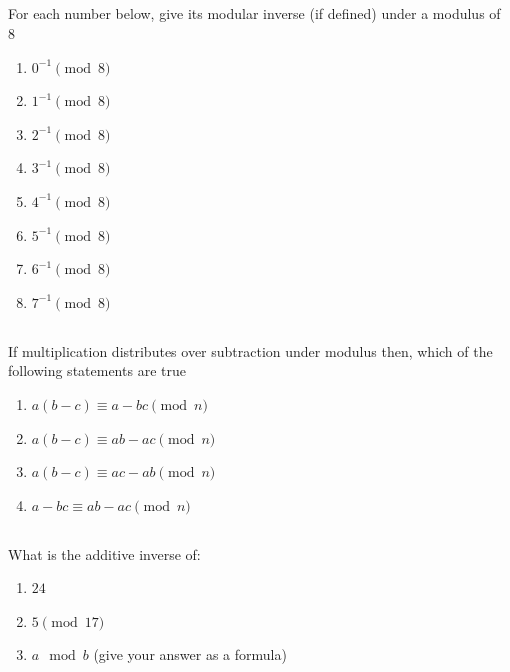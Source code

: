 \documentclass[twocolumn]{article}
\begin{document}
\subsection{}

    For each number below, give its modular inverse (if defined) under a modulus of 8

    \begin{multicols}{2}
    \begin{enumerate}
        \item $ 0^{-1} \pmod{8} $
        \item $ 1^{-1} \pmod{8} $
        \item $ 2^{-1} \pmod{8} $
        \item $ 3^{-1} \pmod{8} $
        \item $ 4^{-1} \pmod{8} $
        \item $ 5^{-1} \pmod{8} $
        \item $ 6^{-1} \pmod{8} $
        \item $ 7^{-1} \pmod{8} $
    \end{enumerate}
\end{multicols}

\subsection{}

    If multiplication distributes over subtraction under modulus then, which of the following statements are true

    \begin{enumerate}
        \item $a ( b - c ) \equiv a - bc \pmod{n} $
        \item $a ( b - c ) \equiv ab - ac \pmod{n} $
        \item $a ( b - c ) \equiv ac - ab \pmod{n} $
        \item $a - bc \equiv ab - ac \pmod{n} $
    \end{enumerate}

\subsection{}

    What is the additive inverse of:

    \begin{enumerate}
        \item $24$
        \item $5 \pmod{17}$
        \item $a \mod b$ (give your answer as a formula)
    \end{enumerate}
\end{document}
